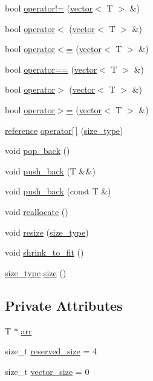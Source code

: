 \begin{DoxyCompactItemize}
\item 
bool \mbox{\hyperlink{classvector_affc26876345a2e9ffb125b311a59486a}{operator!=}} (\mbox{\hyperlink{classvector}{vector}}$<$ T $>$ \&)
\item 
bool \mbox{\hyperlink{classvector_a4d9feb82d6dff052f9ed6239aa8e76f4}{operator$<$}} (\mbox{\hyperlink{classvector}{vector}}$<$ T $>$ \&)
\item 
bool \mbox{\hyperlink{classvector_ad4e5e30ba92e0510c8f5d1bfa52675f4}{operator$<$=}} (\mbox{\hyperlink{classvector}{vector}}$<$ T $>$ \&)
\item 
bool \mbox{\hyperlink{classvector_a37d87b3a77611d3293bdf0cc0cd70686}{operator==}} (\mbox{\hyperlink{classvector}{vector}}$<$ T $>$ \&)
\item 
bool \mbox{\hyperlink{classvector_a75d4ed926224bdb7556655cd938222b5}{operator$>$}} (\mbox{\hyperlink{classvector}{vector}}$<$ T $>$ \&)
\item 
bool \mbox{\hyperlink{classvector_aa2af2138dc13365efa175f9215504817}{operator$>$=}} (\mbox{\hyperlink{classvector}{vector}}$<$ T $>$ \&)
\item 
\mbox{\hyperlink{classvector_a9b1a63f171d76a7a3995b6858e99f2ea}{reference}} \mbox{\hyperlink{classvector_a8493ee7c3c651b0b03afdbe047096a91}{operator\mbox{[}$\,$\mbox{]}}} (\mbox{\hyperlink{classvector_ada51e68d31936547d3729c82daf6b7c6}{size\+\_\+type}})
\item 
void \mbox{\hyperlink{classvector_a058bda4957df6a97b1ea6c9fd783f672}{pop\+\_\+back}} ()
\item 
void \mbox{\hyperlink{classvector_a1b36a29ecdb3c4f319332698a216115e}{push\+\_\+back}} (T \&\&)
\item 
void \mbox{\hyperlink{classvector_a8922d0954d738ead691e43d10c4f5d9f}{push\+\_\+back}} (const T \&)
\item 
void \mbox{\hyperlink{classvector_aa5cad3f031015371cc0bf94aa6a2e5c5}{reallocate}} ()
\item 
void \mbox{\hyperlink{classvector_add2eb5b04f92dc2f8aff3d32b42fb59d}{resize}} (\mbox{\hyperlink{classvector_ada51e68d31936547d3729c82daf6b7c6}{size\+\_\+type}})
\item 
void \mbox{\hyperlink{classvector_a5f16304f80b6fb253c7b0ead3e16dd18}{shrink\+\_\+to\+\_\+fit}} ()
\item 
\mbox{\hyperlink{classvector_ada51e68d31936547d3729c82daf6b7c6}{size\+\_\+type}} \mbox{\hyperlink{classvector_a9428b380b615c7bce6df24117d5b1000}{size}} ()
\end{DoxyCompactItemize}
\subsection*{Private Attributes}
\begin{DoxyCompactItemize}
\item 
T $\ast$ \mbox{\hyperlink{classvector_a146e9e7358f9c0ad7b78c73519623f6c}{arr}}
\item 
size\+\_\+t \mbox{\hyperlink{classvector_a743a68c874026b0316b91628e18cf2e4}{reserved\+\_\+size}} = 4
\item 
size\+\_\+t \mbox{\hyperlink{classvector_a28e18243c88fd99888246e855cc116fd}{vector\+\_\+size}} = 0
\end{DoxyCompactItemize}


